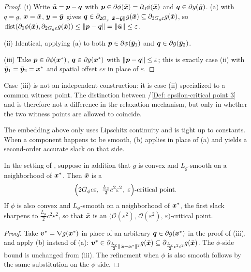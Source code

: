 \begin{proof}
(i) Write $\bar{\bm{u}}=\bm{p}-\bm{q}$ with $\bm{p}\in\partial\phi(\bar{\bm{x}})
=\partial_0\phi(\bar{\bm{x}})$ and $\bm{q}\in\partial g(\bar{\bm{y}})$.
(a) with $q=g$, $\bm{x}=\bar{\bm{x}}$, $\bm{y}=\bar{\bm{y}}$
gives $\bm{q}\in\partial_{2G_g\|\bar{\bm{x}}-\bar{\bm{y}}\|}g(\bar{\bm{x}})\subseteq
\partial_{2G_g\varepsilon}g(\bar{\bm{x}})$, so
$\operatorname{dist}(\partial_0\phi(\bar{\bm{x}}),\partial_{2G_g\varepsilon}g(\bar{\bm{x}}))
\le\|\bm{p}-\bm{q}\|=\|\bar{\bm{u}}\|\le\varepsilon$.

(ii) Identical, applying (a) to both
$\bm{p}\in\partial\phi(\bar{\bm{y}}_1)$ and $\bm{q}\in\partial g(\bar{\bm{y}}_2)$.

(iii) Take $\bm{p}\in\partial\phi(\bm{x}^*)$, $\bm{q}\in\partial g(\bm{x}^*)$ with
$\|\bm{p}-\bm{q}\|\le\varepsilon$; this is exactly case (ii) with
$\bar{\bm{y}}_1=\bar{\bm{y}}_2=\bm{x}^*$ and spatial offset $c\varepsilon$ in place of
$\varepsilon$.
\end{proof}

\begin{remark}
Case (iii) is not an independent construction: it is case (ii)
specialized to a common witness point. The distinction between
/\ref{Def: epsilon-critical point 3}
and  is therefore not a difference in the
relaxation mechanism, but only in whether the two witness points are
allowed to coincide.
\end{remark}

The embedding above only uses Lipschitz continuity and is tight up to
constants. When a component happens to be smooth,
(b) applies in place of (a) and yields a
second-order accurate slack on that side.

\begin{proposition}
\label{prop:sharp-smooth}
In the setting of , suppose in addition that
$g$ is convex and $L_g$-smooth on a neighborhood of $\bm{x}^*$. Then
$\bar{\bm{x}}$ is a
\[
    \Bigl(2G_\phi c\varepsilon,\ \tfrac{L_g}{2}c^2\varepsilon^2,\
    \varepsilon\Bigr)\text{-critical point}.
\]
If $\phi$ is also convex and $L_\phi$-smooth on a neighborhood of
$\bm{x}^*$, the first slack sharpens to $\tfrac{L_\phi}{2}c^2\varepsilon^2$,
so that $\bar{\bm{x}}$ is an
$\bigl(\mathcal O(\varepsilon^2),\,\mathcal O(\varepsilon^2),\,
\varepsilon\bigr)$-critical point.
\end{proposition}

\begin{proof}
Take $\bm{v}^*=\nabla g(\bm{x}^*)$ in place of an arbitrary
$\bm{q}\in\partial g(\bm{x}^*)$ in the proof of
(iii), and apply
(b) instead of (a):
$\bm{v}^*\in\partial_{\frac{L_g}{2}\|\bar{\bm{x}}-\bm{x}^*\|^2}g(\bar{\bm{x}})
\subseteq\partial_{\frac{L_g}{2}c^2\varepsilon^2}g(\bar{\bm{x}})$. The
$\phi$-side bound is unchanged from
(iii). The refinement when
$\phi$ is also smooth follows by the same substitution on the
$\phi$-side.
\end{proof}

